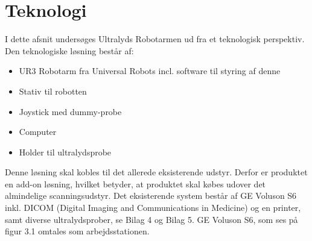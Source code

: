 \chapter{Teknologi} \label{Teknologi}
I dette afsnit undersøges Ultralyds Robotarmen ud fra et teknologisk perspektiv.  \\
Den teknologiske løsning består af:
\begin{itemize}
\item UR3 Robotarm fra Universal Robots incl. software til styring af denne
\item Stativ til robotten
\item Joystick med dummy-probe
\item Computer
\item Holder til ultralydsprobe
\end{itemize}
Denne løsning skal kobles til det allerede eksisterende udstyr. Derfor er produktet en add-on løsning, hvilket betyder, at produktet skal købes udover det almindelige scanningsudstyr. Det eksisterende system består af GE Voluson S6 inkl. DICOM (Digital Imaging and Communications in Medicine) og en printer, samt diverse ultralydsprober, se Bilag 4 og Bilag 5. GE Voluson S6, som ses på figur 3.1 omtales som arbejdsstationen. 

